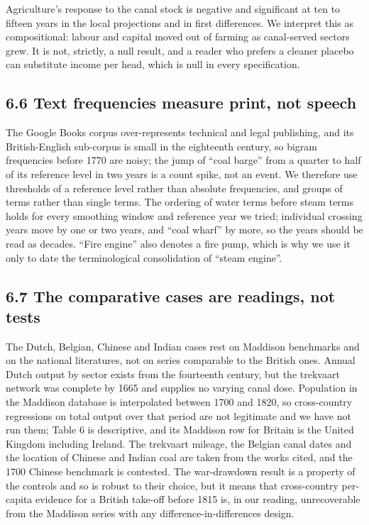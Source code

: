 \documentclass[
  11pt,
]{article}
\begin{document}
Agriculture's response to the canal stock is negative and significant at
ten to fifteen years in the local projections and in first differences.
We interpret this as compositional: labour and capital moved out of
farming as canal-served sectors grew. It is not, strictly, a null
result, and a reader who prefers a cleaner placebo can substitute income
per head, which is null in every specification.

\subsection{6.6 Text frequencies measure print, not
speech}\label{text-frequencies-measure-print-not-speech}

The Google Books corpus over-represents technical and legal publishing,
and its British-English sub-corpus is small in the eighteenth century,
so bigram frequencies before 1770 are noisy; the jump of ``coal barge''
from a quarter to half of its reference level in two years is a count
spike, not an event. We therefore use thresholds of a reference level
rather than absolute frequencies, and groups of terms rather than single
terms. The ordering of water terms before steam terms holds for every
smoothing window and reference year we tried; individual crossing years
move by one or two years, and ``coal wharf'' by more, so the years
should be read as decades. ``Fire engine'' also denotes a fire pump,
which is why we use it only to date the terminological consolidation of
``steam engine''.

\subsection{6.7 The comparative cases are readings, not
tests}\label{the-comparative-cases-are-readings-not-tests}

The Dutch, Belgian, Chinese and Indian cases rest on Maddison benchmarks
and on the national literatures, not on series comparable to the British
ones. Annual Dutch output by sector exists from the fourteenth century,
but the trekvaart network was complete by 1665 and supplies no varying
canal dose. Population in the Maddison database is interpolated between
1700 and 1820, so cross-country regressions on total output over that
period are not legitimate and we have not run them; Table 6 is
descriptive, and its Maddison row for Britain is the United Kingdom
including Ireland. The trekvaart mileage, the Belgian canal dates and
the location of Chinese and Indian coal are taken from the works cited,
and the 1700 Chinese benchmark is contested. The war-drawdown result is
a property of the controls and so is robust to their choice, but it
means that cross-country per-capita evidence for a British take-off
before 1815 is, in our reading, unrecoverable from the Maddison series
with any difference-in-differences design.
\end{document}

